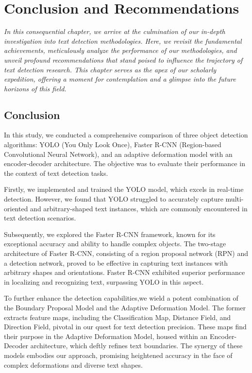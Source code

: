\setlength{\footskip}{8mm}

\chapter{Conclusion and Recommendations}
\label{ch:conclusion}

\textit{In this consequential chapter, we arrive at the culmination of our in-depth investigation into text detection methodologies. Here, we revisit the fundamental achievements, meticulously analyze the performance of our methodologies, and unveil profound recommendations that stand poised to influence the trajectory of text detection research. This chapter serves as the apex of our scholarly expedition, offering a moment for contemplation and a glimpse into the future horizons of this field.}

\section{Conclusion}

In this study, we conducted a comprehensive comparison of three object detection algorithms: YOLO (You Only Look Once), Faster R-CNN (Region-based Convolutional Neural Network), and an adaptive deformation model with an encoder-decoder architecture. The objective was to evaluate their performance in the context of text detection tasks.

Firstly, we implemented and trained the YOLO model, which excels in real-time detection. However, we found that YOLO struggled to accurately capture multi-oriented and arbitrary-shaped text instances, which are commonly encountered in text detection scenarios.

Subsequently, we explored the Faster R-CNN framework, known for its exceptional accuracy and ability to handle complex objects. The two-stage architecture of Faster R-CNN, consisting of a region proposal network (RPN) and a detection network, proved to be effective in capturing text instances with arbitrary shapes and orientations. Faster R-CNN exhibited superior performance in localizing and recognizing text, surpassing YOLO in this aspect.

To further enhance the detection capabilities,we wield a potent combination of the Boundary Proposal Model and the Adaptive Deformation Model. The former extracts feature maps, including the Classification Map, Distance Field, and Direction Field, pivotal in our quest for text detection precision. These maps find their purpose in the Adaptive Deformation Model, housed within an Encoder-Decoder architecture, which deftly refines text boundaries. The synergy of these models embodies our approach, promising heightened accuracy in the face of complex deformations and diverse text shapes. 

